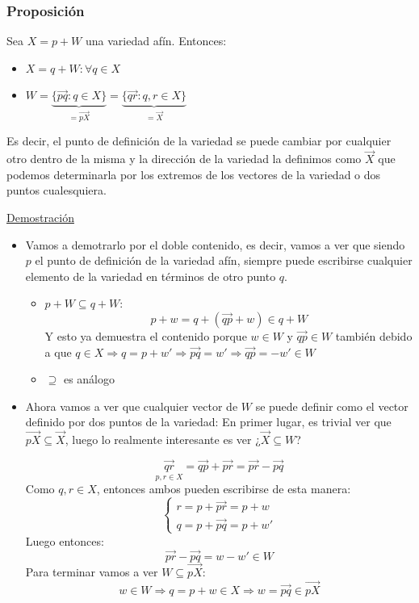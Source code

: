 \documentclass[10pt,a4paper,openright]{book}
\begin{document}
\subsubsection*{Proposición}
Sea $X=p+W$ una variedad afín. Entonces:
\begin{itemize}

\item $X = q + W : \forall q \in X$

\item $W = \underbrace{\{ \vec{pq} : q \in X\}}_{= \vec{pX}} = \underbrace{\{\vec{qr} : q,r \in X\}}_{= \vec{X}}$
\end{itemize}
Es decir, el punto de definición de la variedad se puede cambiar por cualquier otro dentro de la misma y la dirección de la variedad la definimos como $\vec{X}$ que podemos determinarla por los extremos de los vectores de la variedad o dos puntos cualesquiera.

\underline{Demostración}
\begin{itemize}
\item Vamos a demotrarlo por el doble contenido, es decir, vamos a ver que siendo $p$ el punto de definición de la variedad afín, siempre puede escribirse cualquier elemento de la variedad en términos de otro punto $q$.
	\begin{itemize}
	\item $p+W \subseteq q+ W$:
$$p + w = q + (\vec{qp} + w) \in q + W $$
	Y esto ya demuestra el contenido porque $w\in W$ y $\vec{qp} \in W$ también debido a que $q \in X \Rightarrow q = p + w' \Rightarrow \vec{pq} = w' \Rightarrow \vec{qp} = -w' \in W$

	\item $\supseteq$ es análogo

	\end{itemize}


\item Ahora vamos a ver que cualquier vector de $W$ se puede definir como el vector definido por dos puntos de la variedad:
En primer lugar, es trivial ver que $\vec{pX} \subseteq \vec{X}$, luego lo realmente interesante es ver ¿$\vec{X} \subseteq W$?

$$\underset{p,r \in X}{\vec{qr}} = \vec{qp} + \vec{pr} = \vec{pr} - \vec{pq}$$
Como $q,r\in X$, entonces ambos pueden escribirse de esta manera:
$$\begin{cases} r = p + \vec{pr} = p+ w \\ q = p + \vec{pq} = p+w' \end{cases}$$
Luego entonces:
$$\vec{pr} - \vec{pq} = w-w'\in W$$
Para terminar vamos a ver $W \subseteq \vec{pX}$:
$$w \in W \Rightarrow q = p + w \in X \Rightarrow w = \vec{pq} \in \vec{pX}$$

\end{itemize}
\end{document}
